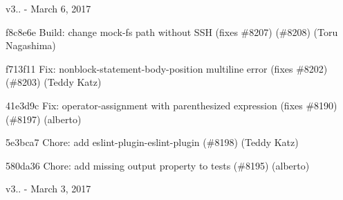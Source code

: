 v3.. -\/ March 6, 2017


\begin{DoxyItemize}
\item f8c8e6e Build\+: change mock-\/fs path without S\+SH (fixes \#8207) (\#8208) (Toru Nagashima)
\item f713f11 Fix\+: nonblock-\/statement-\/body-\/position multiline error (fixes \#8202) (\#8203) (Teddy Katz)
\item 41e3d9c Fix\+: {\ttfamily operator-\/assignment} with parenthesized expression (fixes \#8190) (\#8197) (alberto)
\item 5e3bca7 Chore\+: add eslint-\/plugin-\/eslint-\/plugin (\#8198) (Teddy Katz)
\item 580da36 Chore\+: add missing {\ttfamily output} property to tests (\#8195) (alberto)
\end{DoxyItemize}

v3.. -\/ March 3, 2017


